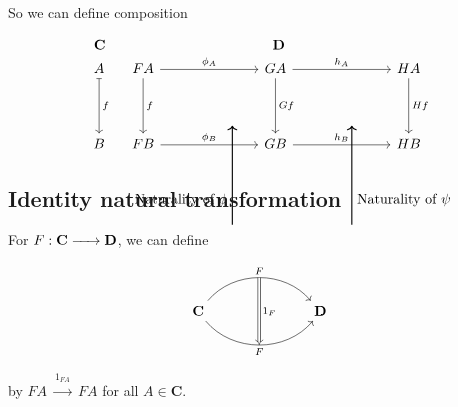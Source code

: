 \documentclass{article}
\renewcommand{\to}{\xrightarrow{\hspace{0.5cm}}}  %
\begin{document}
    So we can define composition

    \[
        \begin{array}{c c} %
            \mathbf{C} & \mathbf{D} \\
            \begin{tikzcd}[column sep=4em, row sep=4em]
                A \arrow[d, mapsto, "f"] \\
                B
            \end{tikzcd}
            &
            \begin{tikzcd}[column sep=7em, row sep=4em]
                FA \arrow[r, "\phi_A"] \arrow[d, "f"]
                & GA \arrow[d, "Gf"] \arrow[r, "h_A"]
                & HA \arrow[d, "Hf"] \\
                FB\arrow[r, "\phi_B"]
                & GB \arrow[r, "h_B"]
                & HB
            \end{tikzcd}
            \begin{tikzpicture}[overlay]
                \draw[->, thick] (-5, -3) -- (-5, -0.5) node[near start, auto] {Naturality of \(\phi\)};
                \draw[->, thick] (-2, -3) -- (-2, -0.5) node[near start, right] {Naturality of \(\psi\)};
            \end{tikzpicture}
        \end{array}
    \]

    \vspace{0.2in}

    \subsection{Identity natural transformation}


    For \(F: \mathbf{C} \to \mathbf{D}\), we can define

    \[
        \begin{tikzcd}[column sep=7em, row sep=4em]
            \mathbf{C} \arrow[r, bend left=50, "F"{name=F, above}]
            \arrow[r, bend right=50, "F"{name=G, below}]
            & \mathbf{D}
            \arrow[Rightarrow, from=F, to=G, "1_F"]
        \end{tikzcd}
    \]

    by \(FA \stackrel{1_{FA}}{\xrightarrow{\hspace{1cm}}} FA\) for all \(A \in \mathbf{C}\).
\end{document}
